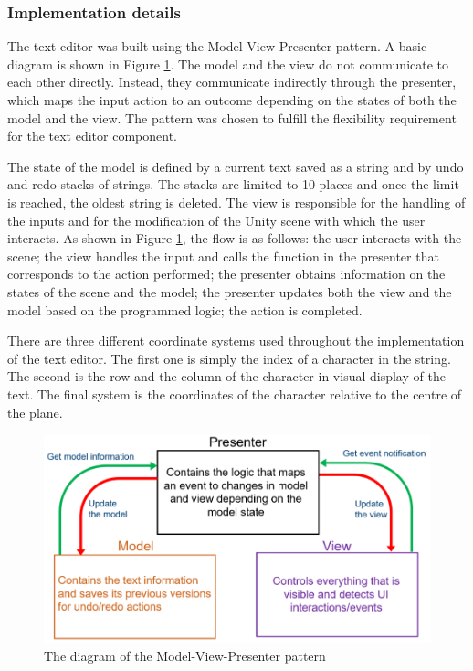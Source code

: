 \documentclass[a4paper, 12pt]{article}
\begin{document}
\vspace{-0.3cm}
\subsubsection{Implementation details}

The text editor was built using the Model-View-Presenter pattern. A basic diagram is shown in Figure \ref{mvp}. The model and the view do not communicate to each other directly. Instead, they communicate indirectly through the presenter, which maps the input action to an outcome depending on the states of both the model and the view. The pattern was chosen to fulfill the flexibility requirement for the text editor component.

The state of the model is defined by a current text saved as a string and by undo and redo stacks of strings. The stacks are limited to 10 places and once the limit is reached, the oldest string is deleted. The view is responsible for the handling of the inputs and for the modification of the Unity scene with which the user interacts. As shown in Figure \ref{mvp}, the flow is as follows: the user interacts with the scene; the view handles the input and calls the function in the presenter that corresponds to the action performed; the presenter obtains information on the states of the scene and the model; the presenter updates both the view and the model based on the programmed logic; the action is completed.

There are three different coordinate systems used throughout the implementation of the text editor. The first one is simply the index of a character in the string. The second is the row and the column of the character in visual display of the text. The final system is the coordinates of the character relative to the centre of the plane.

\begin{figure}
	\centering
	\includegraphics[scale=0.9]{mvp_diagram}
	\caption{The diagram of the Model-View-Presenter pattern}
	\label{mvp}
\end{figure}
\end{document}
